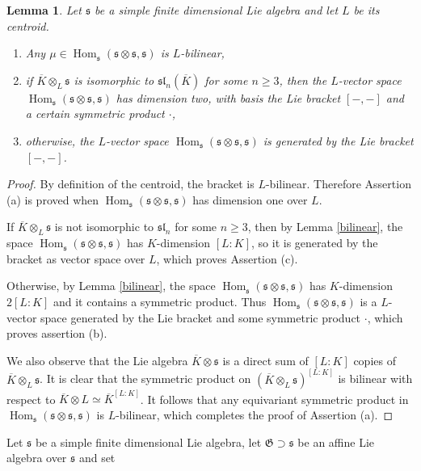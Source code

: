 \documentclass[11pt, letterpaper, reqno]{amsart}
\newtheorem{lemma}[theorem]{Lemma}
\theoremstyle{definition}
\newcommand{\Hom}{\operatorname{Hom}}
\newcommand{\fsl}{\mathfrak{sl}}
\newcommand{\fs}{\mathfrak{s}}
\newcommand{\fG}{\mathfrak{G}}
\begin{document}
\begin{lemma}\label{bilinear2} Let $\fs$ be a simple finite dimensional Lie algebra and let $L$ be its centroid.

\begin{enumerate}
\item[(a)] Any $\mu\in \Hom_\fs(\fs\otimes\fs,\fs)$ is $L$-bilinear,
\item[(b)] if 
$\overline{K}\otimes_L \fs$ is isomorphic to 
$\fsl_n(\overline{K})$ for some $n\geq 3$,
then the $L$-vector space 
$\Hom_\fs(\fs\otimes\fs,\fs)$ has dimension two,
with basis the Lie bracket $[-,-]$ and a 
certain symmetric product $\cdot$,
\item[(c)] otherwise, the $L$-vector space 
$\Hom_\fs(\fs\otimes\fs,\fs)$ is generated by the Lie bracket $[-,-]$.

\end{enumerate}
\end{lemma}

\begin{proof} By definition of the centroid, the bracket is $L$-bilinear. Therefore Assertion (a) is proved when $\Hom_\fs(\fs\otimes\fs,\fs)$ 
has dimension one over $L$.




If $\overline{K}\otimes_L \fs$ is not isomorphic to $\fsl_n$ for some $n\geq 3$, then 
by Lemma \ref{bilinear},  the space
$\Hom_\fs(\fs\otimes\fs,\fs)$ has $K$-dimension
$[L:K]$, so it is generated by the bracket as
vector space over $L$, which proves Assertion (c).

Otherwise, by Lemma \ref{bilinear},  the space
$\Hom_\fs(\fs\otimes\fs,\fs)$ has $K$-dimension
$2[L:K]$ and it contains a symmetric product.
 Thus
$\Hom_\fs(\fs\otimes\fs,\fs)$ is a $L$-vector space generated by the  Lie bracket and some symmetric product $\cdot$, which proves assertion (b).

We also observe that the Lie algebra 
$\overline{K}\otimes \fs$ is a direct sum of
$[L:K]$ copies of $\overline{K}\otimes_L \fs$.
It is clear that the symmetric product on
$(\overline{K}\otimes_L \fs)^{[L:K]}$ is
bilinear with respect to 
${\overline K}\otimes L\simeq  {\overline K}
^{[L:K]}$. It follows that any equivariant symmetric
product in $\Hom_\fs(\fs\otimes\fs,\fs)$
is $L$-bilinear, which completes the proof of Assertion (a).
\end{proof}

Let $\fs$ be a simple finite dimensional Lie algebra, let $\fG\supset\fs$ be an affine Lie algebra over $\fs$ and set
\end{document}
